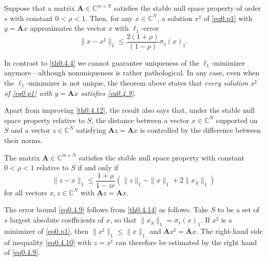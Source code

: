 \begin{theorem}
    \label{th0.4.12}
    Suppose that a matrix $\mathbf{A} \in \mathbb{C}^{m \times N}$ satisfies the stable null space property of order $s$ with constant $0 < \rho <1$. Then, for any $x \in \mathbb{C}^N$, a solution $x^{\sharp}$ of \cref{eq0.p1} with $y = \mathbf{A}x$ approximates the vector $x$ with $\ell_1$-error
    \begin{equation}
        \|x - x^{\sharp}\|_1 \leq \frac{2(1+\rho)}{(1-\rho)} \sigma_s(x)_1.
        \label{eq0.4.9}
    \end{equation}
\end{theorem}

\begin{remark}
    \label{rmk0.4.13}
    In contrast to \cref{th0.4.4} we cannot guarantee uniqueness of the $\ell_1$-minimizer anymore---although nonuniqueness is rather pathological. In any case, even when the $\ell_1$-minimizer is not unique, the theorem above states that \emph{\textcolor[rgb]{1,0,0}{every solution $x^{\sharp}$ of \cref{eq0.p1} with $y = \mathbf{A}x$ satisfies \cref{eq0.4.9}}}.
\end{remark}

Apart from improving \cref{th0.4.12}, the result also says that, under the stable null space property relative to $S$, the distance between a vector $x \in \mathbb{C}^{N}$ supported on $S$ and a vector $z \in \mathbb{C}^N$ satisfying $\mathbf{A}z = \mathbf{A}x$ is controlled by the difference between their norms.

\begin{theorem}
    \label{th0.4.14}
    The matrix $\mathbf{A} \in \mathbb{C}^{m \times N}$ satisfies the stable null space property with constant $0<\rho<1$ relative to $S$ if and only if 
    \begin{equation}
        \|z-x\|_1 \leq \frac{1+\rho}{1-zr}\left( \|z\|_1 - \|x\|_1 +2\|x_{\bar{S}}\|_1 \right)
        \label{eq0.4.10}
    \end{equation}
    for all vectors $x,z \in \mathbb{C}^N$ with $\mathbf{A}z = \mathbf{A}x$.
\end{theorem}

\textcolor[rgb]{1,0,0}{The error bound \cref{eq0.4.9}} follows from \cref{th0.4.14} as follows: Take $S$ to be a set of $s$ largest absolute coefficients of $x$, so that $\|x_{\bar{S}}\|_1 = \sigma_s(x)_1$. If $x^{\sharp}$ is a minimizer of \cref{eq0.p1}, then $\|x^{\sharp}\|_1 \leq \|x\|_1$ and $\mathbf{A}x^{\sharp} = \mathbf{A}x$. The right-hand side of inequality \cref{eq0.4.10} with $z = x^{\sharp}$ can therefore be estimated by the right hand of \cref{eq0.4.9}.

